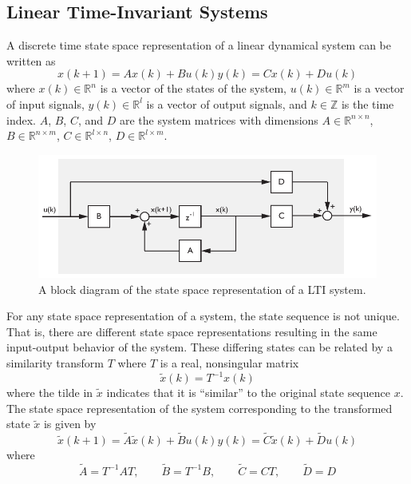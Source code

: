 \subsection{Linear Time-Invariant Systems}\label{sec:linear_time_invariant_systems}
A discrete time state space representation of a linear dynamical system can be written as
\begin{subequations}\label{eq:2_lti_state_space}
\begin{equation}x(k+1) = Ax(k) + Bu(k)\end{equation}
\begin{equation}y(k) = Cx(k) + Du(k)\end{equation}
\end{subequations}
where $x(k) \in \mathbb{R}^n$ is a vector of the states of the system, $u(k) \in \mathbb{R}^m$ is a vector of input signals, $y(k) \in \mathbb{R}^l$ is a vector of output signals, and  $k \in \mathbb{Z}$ is the time index. $A$, $B$, $C$, and $D$ are the system matrices with dimensions $A\in\mathbb{R}^{n\times n}$, $B\in\mathbb{R}^{n\times m}$, $C\in\mathbb{R}^{l\times n}$, $D\in\mathbb{R}^{l\times m}$.
\begin{figure}[htb!]
	\centering
	\includegraphics{../fig/lti_block_diagram.pdf}
	\caption{A block diagram of the state space representation of a LTI system.}
\end{figure}

For any state space representation of a system, the state sequence is not unique. That is, there are different state space representations resulting in the same input-output behavior of the system. These differing states can be related by a similarity transform $T$ where $T$ is a real, nonsingular matrix
\begin{equation*}
\tilde{x}(k) = T^{-1}x(k)
\end{equation*}
where the tilde in $\tilde x$ indicates that it is ``similar'' to the original state sequence $x$. The state space representation of the system corresponding to the transformed state $\tilde{x}$ is given by
\begin{subequations}
\begin{equation*}\tilde{x}(k+1) = \tilde{A}\tilde{x}(k) + \tilde{B}u(k)\end{equation*}
\begin{equation*}y(k) = \tilde{C}\tilde{x}(k) + \tilde{D}u(k)\end{equation*}
\end{subequations}
where
\begin{equation*}
\tilde{A} = T^{-1}AT, \qquad
\tilde{B} = T^{-1}B, \qquad
\tilde{C} = CT, \qquad
\tilde{D} = D
\end{equation*}

